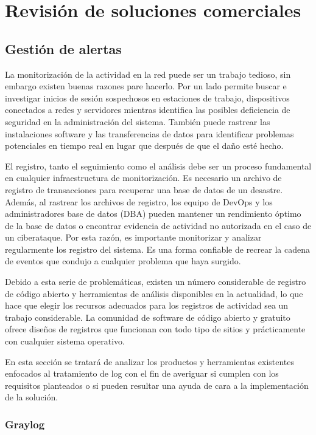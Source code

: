 \chapter{Revisión de soluciones comerciales}

\section{Gestión de alertas}

La monitorización de la actividad en la red puede ser un trabajo tedioso, sin embargo existen buenas razones pare hacerlo. Por un lado permite buscar e investigar inicios de sesión sospechosos en estaciones de trabajo, dispositivos conectados a redes y servidores mientras identifica las posibles deficiencia de seguridad en la administración del sistema. También puede rastrear las instalaciones software y las transferencias de datos para identificar problemas potenciales en tiempo real en lugar que después de que el daño esté hecho.

El registro, tanto el seguimiento como el análisis debe ser un proceso fundamental en cualquier infraestructura de monitorización. Es necesario un archivo de registro de transacciones para recuperar una base de datos de un desastre. Además, al rastrear los archivos de registro, los equipo de DevOps y los administradores base de datos (DBA) pueden mantener un rendimiento óptimo de la base de datos o encontrar evidencia de actividad no autorizada en el caso de un ciberataque. Por esta razón, es importante monitorizar y analizar regularmente los registro del sistema. Es una forma confiable de recrear la cadena de eventos que condujo a cualquier problema que haya surgido.

Debido a esta serie de problemáticas, existen un número considerable de registro de código abierto y herramientas de análisis disponibles en la actualidad, lo que hace que elegir los recursos adecuados para los registros de actividad sea un trabajo considerable. La comunidad de software de código abierto y gratuito ofrece diseños de registros que funcionan con todo tipo de sitios y prácticamente con cualquier sistema operativo. 

En esta sección se tratará de analizar los productos y herramientas existentes enfocados al tratamiento de log con el fin de averiguar si cumplen con los requisitos planteados o si pueden resultar una ayuda de cara a la implementación de la solución.

\subsection{Graylog}

